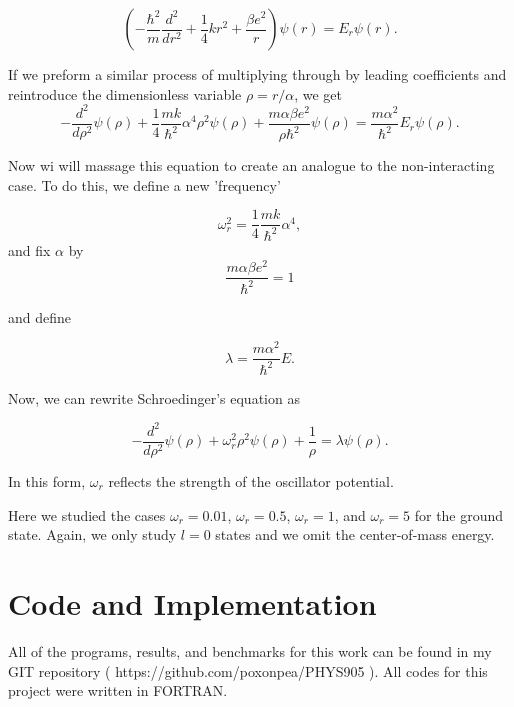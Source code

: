 \documentclass[%
oneside,                 %
final,                   %
10pt]{article}
\begin{document}
\begin{equation*}
\left(  -\frac{\hbar^2}{m} \frac{d^2}{dr^2}+ \frac{1}{4}k r^2+\frac{\beta e^2}{r}\right)\psi(r)  = E_r \psi(r).
\end{equation*}

If we preform a similar process of multiplying through by leading coefficients and reintroduce the dimensionless variable $\rho = r/\alpha$, we get
\begin{equation*}
  -\frac{d^2}{d\rho^2} \psi(\rho) 
       + \frac{1}{4}\frac{mk}{\hbar^2} \alpha^4\rho^2\psi(\rho)+\frac{m\alpha \beta e^2}{\rho\hbar^2}\psi(\rho)  = 
\frac{m\alpha^2}{\hbar^2}E_r \psi(\rho) .
\end{equation*}

Now wi will massage this equation to create an analogue to the non-interacting case.  To do this, we define a new 'frequency'

\begin{equation*}
\omega_r^2=\frac{1}{4}\frac{mk}{\hbar^2} \alpha^4,
\end{equation*}
and fix $\alpha$ by 
\begin{equation*}
\frac{m\alpha \beta e^2}{\hbar^2}=1
\end{equation*}

and define

\begin{equation*}
\lambda = \frac{m\alpha^2}{\hbar^2}E.
\end{equation*}

Now, we can rewrite Schroedinger's equation as

\begin{equation*}
  -\frac{d^2}{d\rho^2} \psi(\rho) + \omega_r^2\rho^2\psi(\rho) +\frac{1}{\rho} = \lambda \psi(\rho).
\end{equation*}

In this form, $\omega_r$ reflects the strength of the oscillator potential.

Here we studied the cases $\omega_r = 0.01$, $\omega_r = 0.5$, $\omega_r =1$,
and $\omega_r = 5$ for the ground state. Again, we only study $l=0$ states and we omit the center-of-mass energy.

\section{Code and Implementation}

All of the programs, results, and benchmarks for this work can be found in my GIT repository ( https://github.com/poxonpea/PHYS905 ).  All codes for this project were written in FORTRAN.
\end{document}
